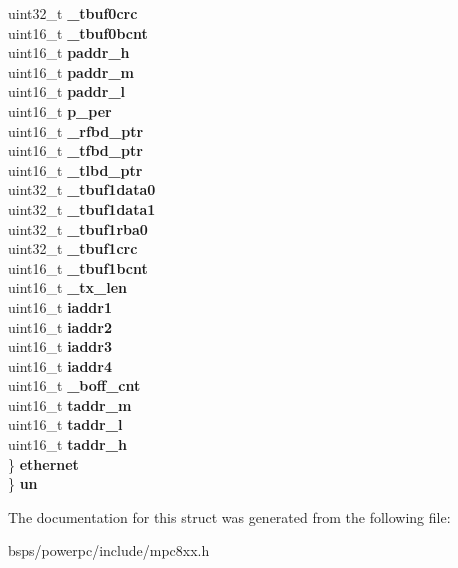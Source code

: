 \begin{DoxyCompactItemize}
\begin{tabbing}
\>\>uint32\_t {\bfseries \_tbuf0crc}\\
\>\>uint16\_t {\bfseries \_tbuf0bcnt}\\
\>\>uint16\_t {\bfseries paddr\_h}\\
\>\>uint16\_t {\bfseries paddr\_m}\\
\>\>uint16\_t {\bfseries paddr\_l}\\
\>\>uint16\_t {\bfseries p\_per}\\
\>\>uint16\_t {\bfseries \_rfbd\_ptr}\\
\>\>uint16\_t {\bfseries \_tfbd\_ptr}\\
\>\>uint16\_t {\bfseries \_tlbd\_ptr}\\
\>\>uint32\_t {\bfseries \_tbuf1data0}\\
\>\>uint32\_t {\bfseries \_tbuf1data1}\\
\>\>uint32\_t {\bfseries \_tbuf1rba0}\\
\>\>uint32\_t {\bfseries \_tbuf1crc}\\
\>\>uint16\_t {\bfseries \_tbuf1bcnt}\\
\>\>uint16\_t {\bfseries \_tx\_len}\\
\>\>uint16\_t {\bfseries iaddr1}\\
\>\>uint16\_t {\bfseries iaddr2}\\
\>\>uint16\_t {\bfseries iaddr3}\\
\>\>uint16\_t {\bfseries iaddr4}\\
\>\>uint16\_t {\bfseries \_boff\_cnt}\\
\>\>uint16\_t {\bfseries taddr\_m}\\
\>\>uint16\_t {\bfseries taddr\_l}\\
\>\>uint16\_t {\bfseries taddr\_h}\\
\>\} {\bfseries ethernet}\\
\} {\bfseries un}\\

\end{tabbing}\end{DoxyCompactItemize}


The documentation for this struct was generated from the following file\+:\begin{DoxyCompactItemize}
\item 
bsps/powerpc/include/mpc8xx.\+h\end{DoxyCompactItemize}
